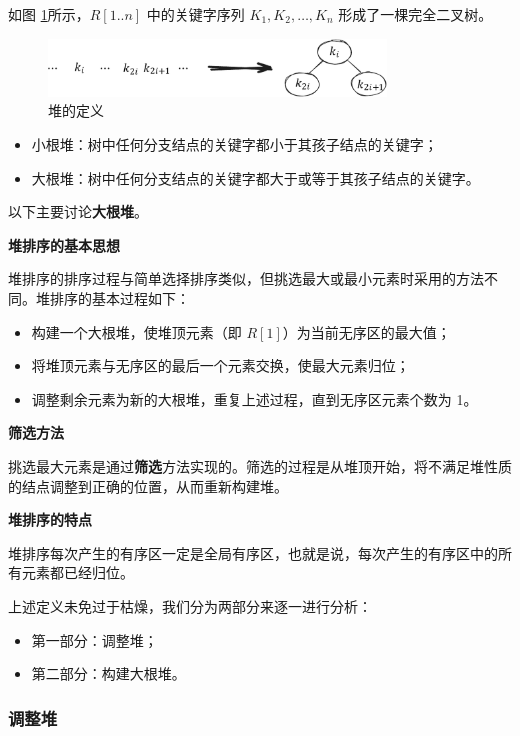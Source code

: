 \documentclass[lang=cn,newtx,10pt,scheme=chinese]{elegantbook}
\begin{document}
如图 \ref{fig:heap}所示，$R[1..n]$ 中的关键字序列 $K_1, K_2, \dots, K_n$ 形成了一棵完全二叉树。

\begin{figure}[h!]
    \centering
    \includegraphics[width=0.8\textwidth]{./figure/pdf/cropped/heap.pdf}
    \caption{堆的定义}
    \label{fig:heap}
\end{figure}
\begin{itemize}
  \item 小根堆：树中任何分支结点的关键字都小于其孩子结点的关键字；
  \item 大根堆：树中任何分支结点的关键字都大于或等于其孩子结点的关键字。
\end{itemize}

以下主要讨论\textbf{大根堆}。


\textbf{堆排序的基本思想}  

堆排序的排序过程与简单选择排序类似，但挑选最大或最小元素时采用的方法不同。堆排序的基本过程如下：
\begin{itemize}
  \item 构建一个大根堆，使堆顶元素（即 $R[1]$）为当前无序区的最大值；
  \item 将堆顶元素与无序区的最后一个元素交换，使最大元素归位；
  \item 调整剩余元素为新的大根堆，重复上述过程，直到无序区元素个数为 1。
\end{itemize}


\textbf{筛选方法}  

挑选最大元素是通过\textbf{筛选}方法实现的。筛选的过程是从堆顶开始，将不满足堆性质的结点调整到正确的位置，从而重新构建堆。


\textbf{堆排序的特点} 

堆排序每次产生的有序区一定是全局有序区，也就是说，每次产生的有序区中的所有元素都已经归位。

上述定义未免过于枯燥，我们分为两部分来逐一进行分析：
\begin{itemize}
  \item 第一部分：调整堆；
  \item 第二部分：构建大根堆。
  \end{itemize}
\subsubsection{调整堆}
\end{document}
